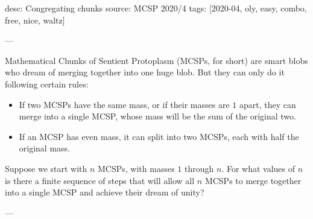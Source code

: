desc: Congregating chunks
source: MCSP 2020/4
tags: [2020-04, oly, easy, combo, free, nice, waltz]

---

Mathematical Chunks of Sentient Protoplasm (MCSPs, for short) are smart blobs who dream of merging together into one huge blob. But they can only do it following certain rules:
\begin{itemize}
    \item If two MCSPs have the same mass, or if their masses are $1$ apart, they can merge into a single MCSP, whose mass will be the sum of the original two.

    \item If an MCSP has even mass, it can split into two MCSPs, each with half the original mass.
\end{itemize}
Suppose we start with $n$ MCSPs, with masses $1$ through $n$. For what values of $n$ is there a finite sequence of steps that will allow all $n$ MCSPs to merge together into a single MCSP and achieve their dream of unity?

---

